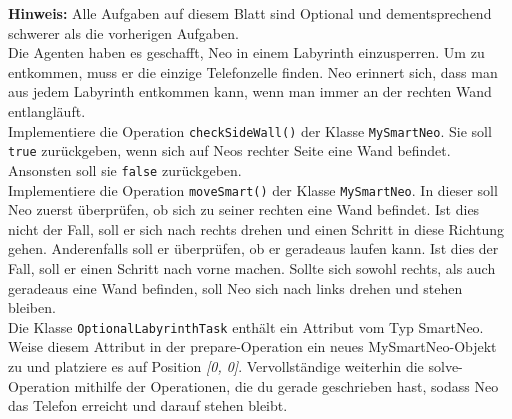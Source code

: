 
\textbf{Hinweis:} Alle Aufgaben auf diesem Blatt sind Optional und dementsprechend schwerer als die vorherigen Aufgaben.\\
	Die Agenten haben es geschafft, Neo in einem Labyrinth einzusperren.
	Um zu entkommen, muss er die einzige Telefonzelle finden.
	Neo erinnert sich, dass man aus jedem Labyrinth entkommen kann, wenn man immer an der rechten Wand entlangläuft.\\

		 Implementiere die Operation \lstinline{checkSideWall()} der Klasse \lstinline{MySmartNeo}.
		Sie soll \lstinline{true} zurückgeben, wenn sich auf Neos rechter Seite eine Wand befindet.
		Ansonsten soll sie \lstinline{false} zurückgeben.\\



		 Implementiere die Operation \lstinline{moveSmart()} der Klasse \lstinline{MySmartNeo}.
		In dieser soll Neo zuerst überprüfen, ob sich zu seiner rechten eine Wand befindet.
		Ist dies nicht der Fall, soll er sich nach rechts drehen und einen Schritt in diese Richtung gehen.
		Anderenfalls soll er überprüfen, ob er geradeaus laufen kann. Ist dies der Fall, soll er einen Schritt nach vorne machen.
		Sollte sich sowohl rechts, als auch geradeaus eine Wand befinden, soll Neo sich nach links drehen und stehen bleiben.\\

		 Die Klasse \lstinline{OptionalLabyrinthTask} enthält ein Attribut vom Typ SmartNeo.
		Weise diesem Attribut in der prepare-Operation ein neues MySmartNeo-Objekt zu und
		platziere es auf Position \emph{[0, 0]}.
		Vervollständige weiterhin die solve-Operation mithilfe der Operationen,
		die du gerade geschrieben hast, sodass Neo das Telefon erreicht und darauf stehen bleibt.

		

	